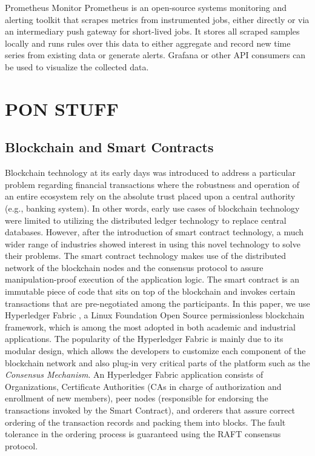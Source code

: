 Prometheus Monitor
Prometheus is an open-source systems monitoring and alerting toolkit that scrapes metrics from instrumented jobs, either directly or via an intermediary push gateway for short-lived jobs. It stores all scraped samples locally and runs rules over this data to either aggregate and record new time series from existing data or generate alerts. Grafana or other API consumers can be used to visualize the collected data.





\section{PON STUFF}

\subsection{Blockchain and Smart Contracts}
Blockchain technology at its early days was introduced to address a particular problem regarding financial transactions where the robustness and operation of an entire ecosystem rely on the absolute trust placed upon a central authority (e.g., banking system). In other words, early use cases of blockchain technology were limited to utilizing the distributed ledger technology to replace central databases. However, after the introduction of smart contract technology, a much wider range of industries showed interest in using this novel technology to solve their problems. The smart contract technology makes use of the distributed network of the blockchain nodes and the consensus protocol to assure manipulation-proof execution of the application logic. The smart contract is an immutable piece of code that sits on top of the blockchain and invokes certain transactions that are pre-negotiated among the participants. In this paper, we use Hyperledger Fabric \cite{fabric}, a Linux Foundation Open Source permissionless blockchain framework, which is among the most adopted in both academic and industrial applications. 
The popularity of the Hyperledger Fabric is mainly due to its modular design, which allows the developers to customize each component of the blockchain network and also plug-in very critical parts of the platform such as the \textit{Consensus Mechanism}. 
An Hyperledger Fabric application consists of Organizations, Certificate Authorities  (CAs in charge of authorization and enrollment of new members), peer nodes (responsible for endorsing the transactions invoked by the Smart Contract), and orderers that assure correct ordering of the transaction records and packing them into blocks. The fault tolerance in the ordering process is guaranteed using the RAFT \cite{Ongaro:raft} consensus protocol. 
